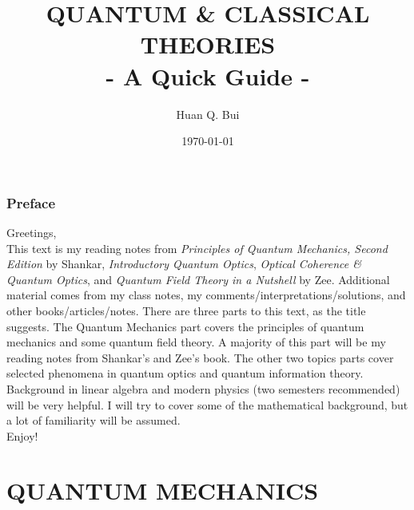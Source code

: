\documentclass{book}
\theoremstyle{definition}
\begin{document}
\begin{titlepage}\centering
 \clearpage
 \title{{\textsc{\textbf{QUANTUM \& CLASSICAL THEORIES}}}\\ \smallskip - A Quick Guide - \\}
 \author{\bigskip Huan Q. Bui}
 \date{\today}
 \maketitle
 \thispagestyle{empty}
\end{titlepage}

\subsection*{Preface}

Greetings,\\

This text is my reading notes from \textit{Principles of Quantum Mechanics, Second Edition} by Shankar, \textit{Introductory Quantum Optics}, \textit{Optical Coherence \& Quantum Optics}, and \textit{Quantum Field Theory in a Nutshell} by Zee. Additional material comes from my class notes, my comments/interpretations/solutions, and other books/articles/notes. There are three parts to this text, as the title suggests. The Quantum Mechanics part covers the principles of quantum mechanics and some quantum field theory. A majority of this part will be my reading notes from Shankar's and Zee's book. The other two topics parts cover selected phenomena in quantum optics and quantum information theory.  \\

Background in linear algebra and modern physics (two semesters recommended) will be very helpful. I will try to cover some of the mathematical background, but a lot of familiarity will be assumed. \\

Enjoy!

\newpage
\tableofcontents
\newpage





\chapter{QUANTUM MECHANICS}
\end{document}
